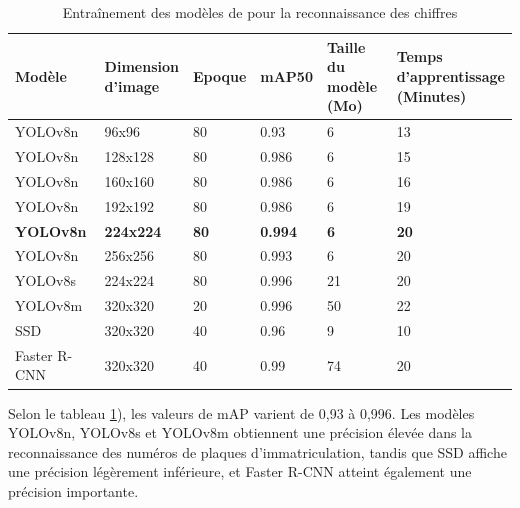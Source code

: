 \begin{table}[H]
    \centering
    \begin{tabular}{|l|l|l|l|l|l|}
    \hline
        Modèle & \shortstack{Dimension \\d'image } & Epoque &    mAP50 & \shortstack{Taille \\du modèle \\(Mo)}   &  \shortstack{Temps \\ d'apprentissage \\ (Minutes)}     \\ \hline
        YOLOv8n & 96x96          &   80         & 0.93   & 6 & 13  \\ \hline
        YOLOv8n & 128x128         &   80       & 0.986   &  6 &  15\\ \hline
        YOLOv8n & 160x160          &   80       & 0.986   &6  & 16 \\ \hline
        YOLOv8n & 192x192         &    80      & 0.986    &6  & 19 \\ \hline
        \textbf{YOLOv8n} & \textbf{224x224} &\textbf{80}& \textbf{0.994}& \textbf{6} &\textbf{20}\\ \hline
        YOLOv8n &  256x256         &   80     & 0.993    & 6 & 20 \\ \hline
        YOLOv8s & 224x224          &   80      & 0.996   & 21 &  20\\ \hline
        YOLOv8m & 320x320          &    20    & 0.996     & 50  & 22 \\ \hline
        SSD      & 320x320         &   40      & 0.96        & 9 & 10 \\ \hline
        Faster R-CNN & 320x320      & 40        & 0.99    & 74 &  20\\ \hline
    \end{tabular}
    \caption{Entraînement des modèles de pour la reconnaissance des chiffres}
    \label{table:ch4-training_ocr_allmodels}
\end{table}


Selon le tableau \ref{table:ch4-training_ocr_allmodels}), les valeurs de mAP varient de 0,93 à 0,996. Les modèles YOLOv8n, YOLOv8s et YOLOv8m obtiennent une précision élevée dans la reconnaissance des numéros de plaques d'immatriculation, tandis que SSD affiche une précision légèrement inférieure, et Faster R-CNN atteint également une précision importante.

